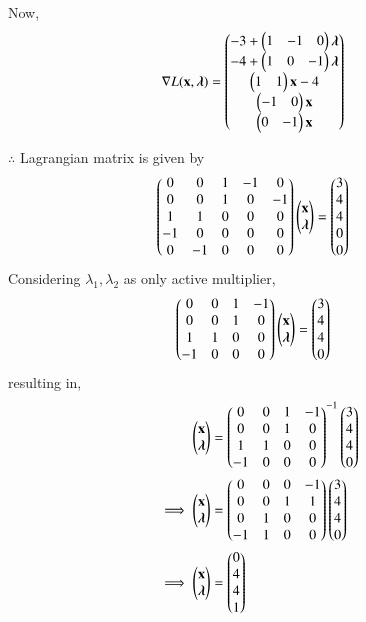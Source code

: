 \documentclass[journal,12pt,twocolumn]{IEEEtran}
\begin{document}
Now,
\begin{align}
    \nabla L(\mathbf{x},\boldsymbol{\lambda}) &= \begin{pmatrix}-3 + \begin{pmatrix}1 & -1 & 0 \end{pmatrix}\boldsymbol{\lambda}\\ -4+\begin{pmatrix}1 & 0 & -1 \end{pmatrix}\boldsymbol{\lambda} \\ \begin{pmatrix}1 & 1\end{pmatrix}\mathbf{x}-4 \\ \begin{pmatrix}-1 & 0\end{pmatrix}\mathbf{x} \\ \begin{pmatrix}0 & -1\end{pmatrix}\mathbf{x}\end{pmatrix}
\end{align}

$\therefore$ Lagrangian matrix is given by
\begin{align}
    \begin{pmatrix}0 & 0 & 1 & -1 & 0 \\ 0 & 0 & 1 & 0 & -1 \\ 1 & 1 & 0 & 0 & 0 \\ -1 & 0 & 0 & 0 & 0  \\ 0 & -1 & 0 & 0 & 0 \end{pmatrix}\begin{pmatrix}\mathbf{x} \\ \boldsymbol{\lambda} \end{pmatrix} &= \begin{pmatrix}3 \\ 4 \\ 4 \\ 0 \\ 0 \end{pmatrix}
\end{align}
Considering $\lambda_1,\lambda_2$ as only active multiplier,
\begin{align}
    \begin{pmatrix}0 & 0 & 1 & -1  \\ 0 & 0 & 1 & 0  \\ 1 & 1 & 0 & 0 \\ -1 & 0 & 0 & 0 \end{pmatrix}\begin{pmatrix}\mathbf{x}\\ \boldsymbol{\lambda}\end{pmatrix} &= \begin{pmatrix}3 \\ 4 \\ 4 \\ 0\end{pmatrix}
\end{align}
resulting in,
\begin{align}
    \begin{pmatrix}\mathbf{x} \\ \boldsymbol{\lambda}\end{pmatrix} &= \begin{pmatrix}0 & 0 & 1 & -1\\ 0 & 0 & 1 & 0 \\ 1 & 1 & 0 & 0 \\ -1 & 0 & 0 & 0\end{pmatrix}^{-1}\begin{pmatrix}3 \\ 4 \\ 4 \\ 0\end{pmatrix}
    \\
    \implies   \begin{pmatrix}\mathbf{x} \\ \boldsymbol{\lambda}\end{pmatrix} &= \begin{pmatrix}0 & 0 & 0 & -1 \\ 0 & 0 & 1 & 1 \\  0 & 1 & 0 & 0 \\ -1 & 1 & 0 & 0\end{pmatrix}\begin{pmatrix}3 \\ 4 \\ 4 \\ 0\end{pmatrix}
    \\
    \implies \begin{pmatrix}\mathbf{x} \\ \boldsymbol{\lambda}\end{pmatrix} &= \begin{pmatrix}0 \\ 4 \\ 4 \\ 1 \end{pmatrix}
\end{align}
\end{document}
